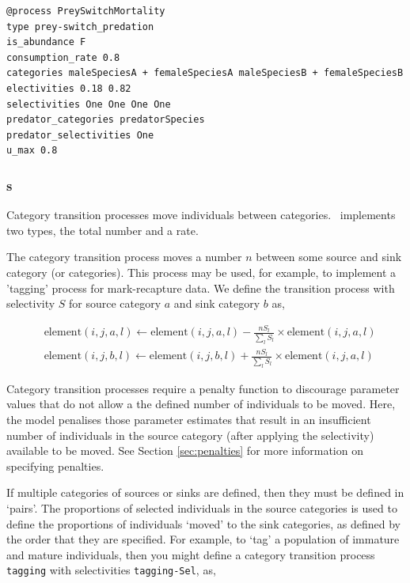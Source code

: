 {\small{\begin{verbatim}
@process PreySwitchMortality
type prey-switch_predation
is_abundance F
consumption_rate 0.8
categories maleSpeciesA + femaleSpeciesA maleSpeciesB + femaleSpeciesB
electivities 0.18 0.82
selectivities One One One One
predator_categories predatorSpecies
predator_selectivities One
u_max 0.8
\end{verbatim}}}

\subsubsection{s}

Category transition processes move individuals between categories. \SPM\ implements two types, the total number and a rate. 

The category transition process moves a number $n$ between some source and sink category (or categories). This process may be used, for example, to implement a 'tagging' process for mark-recapture data. We define the transition process with selectivity $S$ for source category $a$ and sink category $b$ as,

\begin{equation}\begin{split}
  & \text{element}(i,j,a,l) \leftarrow \text{element}(i,j,a,l) - \frac{nS_l}{\sum\limits_l S_l} \times \text{element}(i,j,a,l) \\
  & \text{element}(i,j,b,l) \leftarrow \text{element}(i,j,b,l) + \frac{nS_l}{\sum\limits_l S_l} \times \text{element}(i,j,a,l)
\end{split}\end{equation}

Category transition processes require a penalty function to discourage parameter values that do not allow a the defined number of individuals to be moved. Here, the model penalises those parameter estimates that result in an insufficient number of individuals in the source category (after applying the selectivity) available to be moved. See Section \ref{sec:penalties} for more information on specifying penalties.

If multiple categories of sources or sinks are defined, then they must be defined in `pairs'. The proportions of selected individuals in the source categories is used to define the proportions of individuals `moved' to the sink categories, as defined by the order that they are specified. For example, to `tag' a population of immature and mature individuals, then you might define a category transition process \texttt{tagging} with selectivities \texttt{tagging-Sel}, as,

